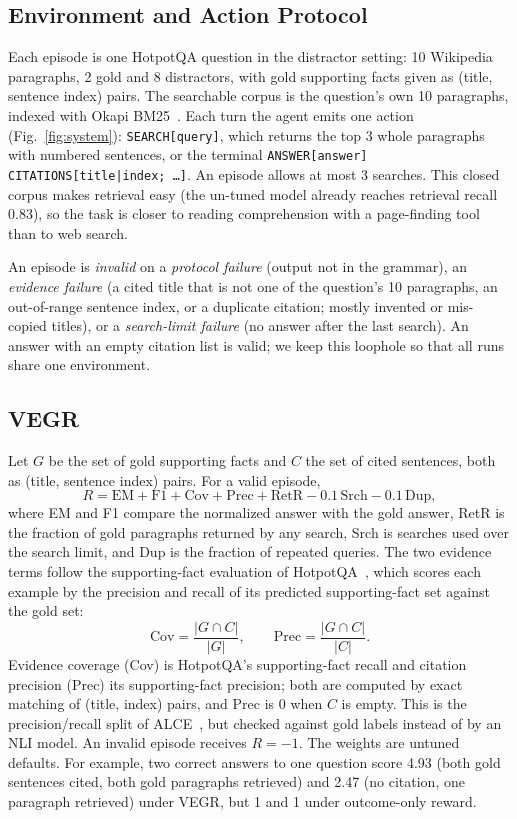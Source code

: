 \documentclass[conference]{IEEEtran}
\begin{document}
\subsection{Environment and Action Protocol}
Each episode is one HotpotQA question in the distractor setting: 10 Wikipedia paragraphs, 2 gold and 8 distractors, with gold supporting facts given as (title, sentence index) pairs. The searchable corpus is the question's own 10 paragraphs, indexed with Okapi BM25~\cite{robertson2009bm25}. Each turn the agent emits one action (Fig.~\ref{fig:system}): \texttt{SEARCH[query]}, which returns the top 3 whole paragraphs with numbered sentences, or the terminal \texttt{ANSWER[answer] CITATIONS[title|index; \ldots]}. An episode allows at most 3 searches. This closed corpus makes retrieval easy (the un-tuned model already reaches retrieval recall 0.83), so the task is closer to reading comprehension with a page-finding tool than to web search.

An episode is \emph{invalid} on a \emph{protocol failure} (output not in the grammar), an \emph{evidence failure} (a cited title that is not one of the question's 10 paragraphs, an out-of-range sentence index, or a duplicate citation; mostly invented or mis-copied titles), or a \emph{search-limit failure} (no answer after the last search). An answer with an empty citation list is valid; we keep this loophole so that all runs share one environment.

\subsection{VEGR}
Let $G$ be the set of gold supporting facts and $C$ the set of cited sentences, both as (title, sentence index) pairs. For a valid episode,
\begin{equation}
R = \mathrm{EM} + \mathrm{F1} + \mathrm{Cov} + \mathrm{Prec} + \mathrm{RetR} - 0.1\,\mathrm{Srch} - 0.1\,\mathrm{Dup},
\label{eq:vegr}
\end{equation}
where EM and F1 compare the normalized answer with the gold answer, RetR is the fraction of gold paragraphs returned by any search, Srch is searches used over the search limit, and Dup is the fraction of repeated queries. The two evidence terms follow the supporting-fact evaluation of HotpotQA~\cite{yang2018hotpotqa}, which scores each example by the precision and recall of its predicted supporting-fact set against the gold set:
\begin{equation}
\mathrm{Cov} = \frac{|G\cap C|}{|G|}, \qquad \mathrm{Prec} = \frac{|G\cap C|}{|C|}.
\label{eq:cov}
\end{equation}
Evidence coverage (Cov) is HotpotQA's supporting-fact recall and citation precision (Prec) its supporting-fact precision; both are computed by exact matching of (title, index) pairs, and Prec is 0 when $C$ is empty. This is the precision/recall split of ALCE~\cite{gao2023alce}, but checked against gold labels instead of by an NLI model. An invalid episode receives $R=-1$. The weights are untuned defaults. For example, two correct answers to one question score 4.93 (both gold sentences cited, both gold paragraphs retrieved) and 2.47 (no citation, one paragraph retrieved) under VEGR, but 1 and 1 under outcome-only reward.
\end{document}
